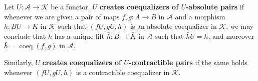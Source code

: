 Let $U: \mathcal{A} \to \mathcal{K}$ be a functor. $U$ \textbf{creates coequalizers of $U$-absolute pairs} if whenever we are given a pair of maps $f, g: A \to B$ in $\mathcal{A}$ and a morphism $h: BU \to K$ in $\mathcal{K}$ such that $(fU, gU, h)$ is an absolute coequalizer in $\mathcal{K}$, we may conclude that $h$ has a unique lift $\bar{h}: B \to \bar{K}$ in $\mathcal{A}$ such that $\bar{h}U = h$, and moreover $\bar{h} = \operatorname{coeq}(f, g)$ in $\mathcal{A}$.

Similarly, $U$ \textbf{creates coequalizers of $U$-contractible pairs} if the same holds whenever $(fU, gU, h)$ is a contractible coequalizer in $\mathcal{K}$.
